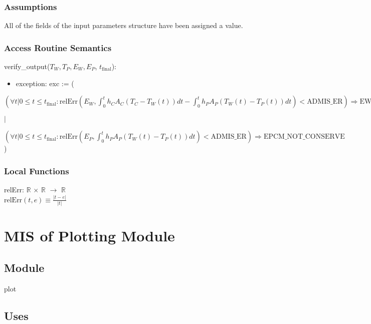 \documentclass[12pt, titlepage]{article}
\begin{document}
\subsubsection{Assumptions}

All of the fields of the input parameters structure have been assigned a
value.  

\subsubsection{Access Routine Semantics}

\noindent verify\_output($T_W, T_P, E_W, E_P$, $t_\text{final}$):
\begin{itemize}
\item exception: exc := (
\end{itemize}

\noindent $
(\forall t | 0 \leq t \leq t_\text{final} : \text{relErr}(E_W,
\int_{0}^{t} h_C A_C (T_C - T_W(t)) dt - \int_{0}^{t} h_P A_P (T_W(t)
- T_P(t)) dt) < \text{ADMIS\_ER}) \Rightarrow \text{EWAT\_NOT\_CONSERVE}
$

$|$

\noindent $ 
(\forall t | 0 \leq t \leq t_\text{final} : \text{relErr}(E_{P}, \int_{0}^{t}
h_{P} A_{P} (T_{W}(t) - T_{P}(t)) dt) < \text{ADMIS\_ER}) \Rightarrow
\text{EPCM\_NOT\_CONSERVE} 
$
)

\subsubsection{Local Functions}

relErr: $\mathbb{R}$ $\times$ $\mathbb{R}$ $\rightarrow$ $\mathbb{R}$ \\
$\text{relErr}(t, e) \equiv \frac{|t - e|}{|t|}$ \\
\newline

\newpage
\section{MIS of Plotting Module} \label{Plot}

\subsection{Module}

plot

\subsection{Uses}
\end{document}
